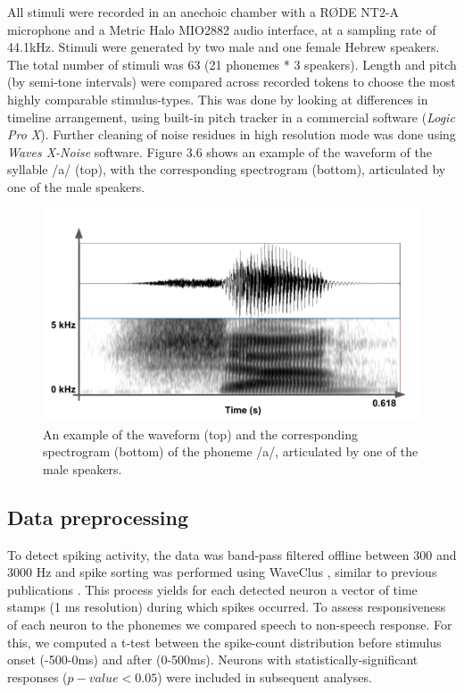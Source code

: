 All stimuli were recorded in an anechoic chamber with a RØDE NT2-A microphone and a Metric Halo MIO2882 audio interface, at a sampling rate of 44.1kHz. Stimuli were generated by two male and one female Hebrew speakers. The total number of stimuli was 63 (21 phonemes * 3 speakers). Length and pitch (by semi-tone intervals) were compared across recorded tokens to choose the most highly comparable stimulus-types. This was done by looking at differences in timeline arrangement, using built-in pitch tracker in a commercial software (\textit{Logic Pro X}). Further cleaning of noise residues in high resolution mode was done using \textit{Waves X-Noise} software. Figure 3.6 shows an example of the waveform of the syllable /a/ (top), with the corresponding spectrogram (bottom), articulated by one of the male speakers. 

\begin{figure}[h]
\vspace{.3in}
\includegraphics[width=\linewidth]{Figures/Ch3/spectrogram_sha.png}
\caption{An example of the waveform (top) and the corresponding spectrogram (bottom) of the phoneme /a/, articulated by one of the male speakers.}
\end{figure}

\subsection{Data preprocessing}
To detect spiking activity, the data was band-pass filtered offline between 300 and 3000 Hz and spike sorting was performed using WaveClus \citep{quiroga2004unsupervised}, similar to previous publications \citep{quiroga2005invariant}. This process yields for each detected neuron a vector of time stamps (1 ms resolution) during which spikes occurred. To assess responsiveness of each neuron to the phonemes we compared speech to non-speech response. For this, we computed a t-test between the spike-count distribution before stimulus onset (-500-0ms) and after (0-500ms). Neurons with statistically-significant responses ($p-value<0.05$) were included in subsequent analyses. 

